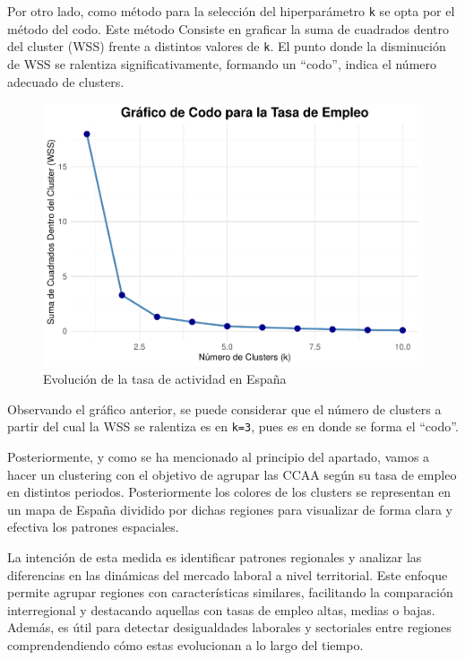 \documentclass[notspecified,article,submit,moreauthors,pdftex]{Definitions/mdpi}
\begin{document}
Por otro lado, como método para la selección del hiperparámetro
\texttt{k} se opta por el método del codo. Este método Consiste en
graficar la suma de cuadrados dentro del cluster (WSS) frente a
distintos valores de \texttt{k}. El punto donde la disminución de WSS se
ralentiza significativamente, formando un ``codo'', indica el número
adecuado de clusters.

\begin{figure}[h]

{\centering \includegraphics[width=0.6\linewidth]{ProyectoAED2024_files/figure-latex/unnamed-chunk-34-1} 

}

\caption{Evolución de la tasa de actividad en España}\label{fig:unnamed-chunk-34}
\end{figure}

Observando el gráfico anterior, se puede considerar que el número de
clusters a partir del cual la WSS se ralentiza es en \texttt{k=3}, pues
es en donde se forma el ``codo''.

Posteriormente, y como se ha mencionado al principio del apartado, vamos
a hacer un clustering con el objetivo de agrupar las CCAA según su tasa
de empleo en distintos periodos. Posteriormente los colores de los
clusters se representan en un mapa de España dividido por dichas
regiones para visualizar de forma clara y efectiva los patrones
espaciales.

La intención de esta medida es identificar patrones regionales y
analizar las diferencias en las dinámicas del mercado laboral a nivel
territorial. Este enfoque permite agrupar regiones con características
similares, facilitando la comparación interregional y destacando
aquellas con tasas de empleo altas, medias o bajas. Además, es útil para
detectar desigualdades laborales y sectoriales entre regiones
comprendendiendo cómo estas evolucionan a lo largo del tiempo.
\end{document}
